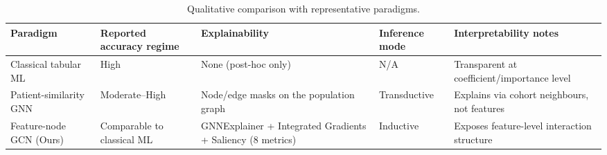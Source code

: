 \begin{table}[t]
\centering
\caption{Qualitative comparison with representative paradigms.}
\label{tab:literature}
\footnotesize
\begin{tabular}{p{2.6cm}p{2.0cm}p{3.0cm}p{1.6cm}p{3.0cm}}
\toprule
Paradigm & Reported accuracy regime & Explainability & Inference mode & Interpretability notes \\
\midrule
Classical tabular ML~\cite{mohan2019hybrid,latha2019ensemble} & High & None (post-hoc only) & N/A & Transparent at coefficient/importance level \\
Patient-similarity GNN~\cite{parisot2018disease} & Moderate--High & Node/edge masks on the population graph & Transductive & Explains via cohort neighbours, not features \\
Feature-node GCN (Ours) & Comparable to classical ML & GNNExplainer + Integrated Gradients + Saliency (8 metrics) & Inductive & Exposes feature-level interaction structure \\
\bottomrule
\end{tabular}
\end{table}
